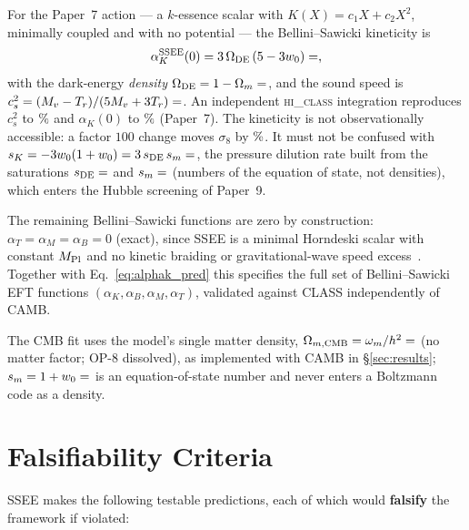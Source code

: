 \documentclass[12pt,a4paper]{article}
\begin{document}
For the Paper~7 action --- a $k$-essence scalar with $K(X)=c_1X+c_2X^2$,
minimally coupled and with no potential --- the Bellini--Sawicki kineticity is
\begin{equation}
  \alpha_K^{\rm SSEE}(0) = 3\,\Omega_{\rm DE}\,(5-3w_0) = \val{alpha_K_z0_d6},
  \label{eq:alphak_pred}
\end{equation}
with the dark-energy \emph{density} $\Omega_{\rm DE}=1-\Omega_m=\val{OMDE_DENS_d6}$, and the
sound speed is $c_s^2=(M_v-T_r)/(5M_v+3T_r)=\val{cs2_condensado_d6}$. An independent
\textsc{hi\_class} integration reproduces $c_s^2$ to $\val{p7_hc_cs2_pct}\%$ and
$\alpha_K(0)$ to $\val{p7_hc_alphaK_pct}\%$ (Paper~7). The kineticity is not observationally
accessible: a factor $100$ change moves $\sigma_8$ by $\val{p7_hc_s8_xk_pct}\%$. It must not be
confused with $s_K=-3w_0(1+w_0)=3\,s_{\rm DE}\,s_m=\val{S_K_d6}$, the pressure
dilution rate built from the saturations $s_{\rm DE}=\val{S_DE_d6}$ and
$s_m=\val{S_M_d6}$ (numbers of the equation of state, not densities), which enters
the Hubble screening of Paper~9.

The remaining Bellini--Sawicki functions are zero by construction:
$\alpha_T=\alpha_M=\alpha_B=0$ (exact), since SSEE is a minimal
Horndeski scalar with constant $M_{\rm Pl}$ and no kinetic braiding
or gravitational-wave speed excess~\citep{GW170817}. Together with
Eq.~\eqref{eq:alphak_pred} this specifies the full set of Bellini--Sawicki EFT
functions $(\alpha_K,\alpha_B,\alpha_M,\alpha_T)$, validated against CLASS independently of CAMB.

The CMB fit uses the model's single matter density,
$\Omega_{m,\rm CMB}=\omega_m/h^2=\val{OMEGA_M_TOTAL_d6}$ (no matter factor; OP-8
dissolved), as implemented with CAMB in \S\ref{sec:results}; $s_m=1+w_0=\val{S_M_d6}$
is an equation-of-state number and never enters a Boltzmann code as a density.

\section{Falsifiability Criteria}
\label{sec:falsifiability}

SSEE makes the following testable predictions,
each of which would \textbf{falsify} the framework if violated:
\end{document}
